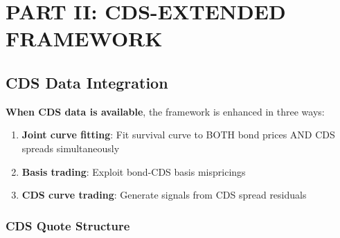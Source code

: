\documentclass[11pt,a4paper]{article}
\begin{document}
\section{PART II: CDS-EXTENDED FRAMEWORK}

\subsection{CDS Data Integration}

\begin{keybox}
\textbf{When CDS data is available}, the framework is enhanced in three ways:

\begin{enumerate}
    \item \textbf{Joint curve fitting}: Fit survival curve to BOTH bond prices AND CDS spreads simultaneously
    \item \textbf{Basis trading}: Exploit bond-CDS basis mispricings
    \item \textbf{CDS curve trading}: Generate signals from CDS spread residuals
\end{enumerate}
\end{keybox}

\subsubsection{CDS Quote Structure}
\end{document}
